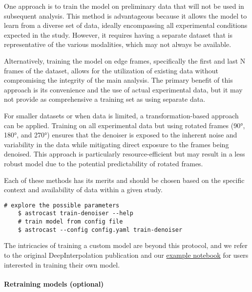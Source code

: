 One approach is to train the model on preliminary data that will not be used in subsequent analysis. This method is
advantageous because it allows the model to learn from a diverse set of data, ideally encompassing all experimental
conditions expected in the study. However, it requires having a separate dataset that is representative of the
various modalities, which may not always be available.

Alternatively, training the model on edge frames, specifically the first and last N frames of the dataset, allows for
the utilization of existing data without compromising the integrity of the main analysis. The primary benefit of this
approach is its convenience and the use of actual experimental data, but it may not provide as comprehensive a
training set as using separate data.

For smaller datasets or when data is limited, a transformation-based approach can be applied. Training on all
experimental data but using rotated frames (90°, 180°, and 270°) ensures that the denoiser is exposed to the inherent
noise and variability in the data while mitigating direct exposure to the frames being denoised. This approach is
particularly resource-efficient but may result in a less robust model due to the potential predictability of rotated
frames.

Each of these methods has its merits and should be chosen based on the specific context and availability of data
within a given study.

\begin{lstlisting}[style=bashStyle]
    # explore the possible parameters
    $ astrocast train-denoiser --help
    # train model from config file
    $ astrocast --config config.yaml train-denoiser
\end{lstlisting}

The intricacies of training a custom model are beyond this protocol, and we refer to the original DeepInterpolation
publication\citep{lecoq_removing_2021} and our \href{https://github.com/janreising/astroCAST/blob/8451394bc0d810c4037011f0bcb9cba1f10d1e72/notebooks/examples/train_denoiser_models.ipynb}{example notebook} for users interested in training their own model.


\paragraph{Retraining models (optional)}


